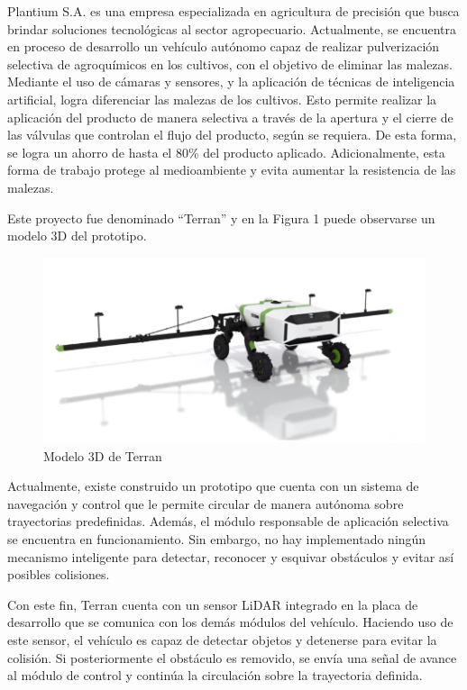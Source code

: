 \documentclass[
11pt, %
]{charter}
\begin{document}
Plantium S.A. es una empresa especializada en agricultura de precisión que busca brindar soluciones tecnológicas al sector agropecuario. Actualmente, se encuentra en proceso de desarrollo un vehículo autónomo capaz de realizar pulverización selectiva de agroquímicos en los cultivos, con el objetivo de eliminar las malezas. Mediante el uso de cámaras y sensores, y la aplicación de técnicas de inteligencia artificial, logra diferenciar las malezas de los cultivos. Esto permite realizar la aplicación del producto de manera selectiva a través de la apertura y el cierre de las válvulas que controlan el flujo del producto, según se requiera. De esta forma, se logra un ahorro de hasta el 80\% del producto aplicado. Adicionalmente, esta forma de trabajo protege al medioambiente y evita aumentar la resistencia de las malezas.

Este proyecto fue denominado “Terran” y en la Figura 1 puede observarse un modelo 3D del prototipo.

\begin{figure}[htpb]
\centering 
\includegraphics[width=.8\textwidth]{./Figuras/terran_3d.png}
\caption{Modelo 3D de Terran}
\label{fig:terran_3d}
\end{figure}

Actualmente, existe construido un prototipo que cuenta con un sistema de navegación y control que le permite circular de manera autónoma sobre trayectorias predefinidas. Además, el módulo responsable de aplicación selectiva se encuentra en funcionamiento. Sin embargo, no hay implementado ningún mecanismo inteligente para detectar, reconocer y esquivar obstáculos y evitar así posibles colisiones.

Con este fin, Terran cuenta con un sensor LiDAR integrado en la placa de desarrollo que se comunica con los demás módulos del vehículo. Haciendo uso de este sensor, el vehículo es capaz de detectar objetos y detenerse para evitar la colisión. Si posteriormente el obstáculo es removido, se envía una señal de avance al módulo de control y continúa la circulación sobre la trayectoria definida.
\end{document}
